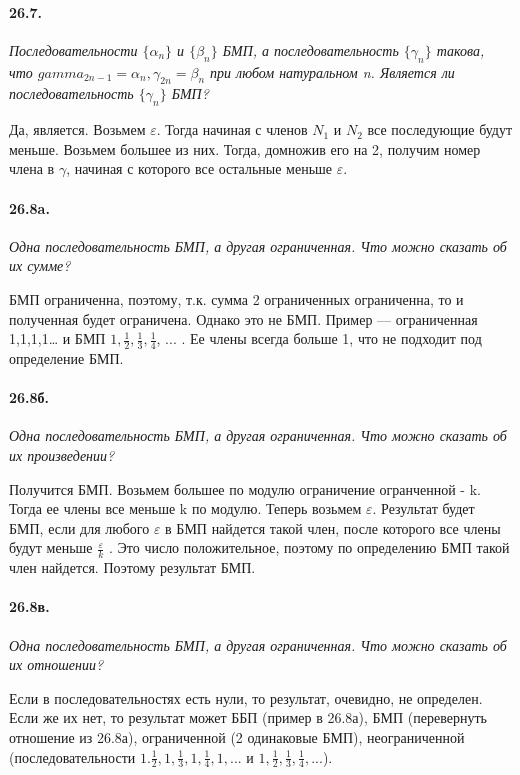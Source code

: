 \documentclass{book}
\begin{document}
\paragraph{26.7.}
\textit{Последовательности $\{\alpha_n\}$ и $\{\beta_n\}$ БМП, а последовательность $\{\gamma_n\}$ такова, что $gamma_{2n -1} = \alpha_n, \gamma_{2n} = \beta_n$ при любом натуральном n. Является ли последовательность $\{\gamma_n\}$ БМП?}

Да, является. Возьмем $\varepsilon$. Тогда начиная с членов $N_1$ и $N_2$ все последующие будут меньше. Возьмем большее из них. Тогда, домножив его на 2, получим номер члена в $\gamma$, начиная с которого все остальные меньше $\varepsilon$.

\paragraph{26.8a.}
\textit{Одна последовательность БМП, а другая ограниченная. Что можно сказать об их сумме?}

БМП ограниченна, поэтому, т.к. сумма 2 ограниченных ограниченна, то и полученная будет ограничена. Однако это не БМП. Пример — ограниченная 1,1,1,1… и БМП $1, \frac{1}{2}, \frac{1}{3}, \frac{1}{4}$, ... . Ее члены всегда больше 1, что не подходит под определение БМП.

\paragraph{26.8б.}
\textit{Одна последовательность БМП, а другая ограниченная. Что можно сказать об их произведении?}

Получится БМП. Возьмем большее по модулю ограничение огранченной - k. Тогда ее члены все меньше k по модулю. Теперь возьмем $\varepsilon$. Результат будет БМП, если для любого $\varepsilon$ в БМП найдется такой член, после которого все члены будут меньше $\frac{\varepsilon}{k}$ . Это число положительное, поэтому по определению БМП такой член найдется. Поэтому результат БМП.

\paragraph{26.8в.}
\textit{Одна последовательность БМП, а другая ограниченная. Что можно сказать об их отношении?}

Если в последовательностях есть нули, то результат, очевидно, не определен. Если же их нет, то результат может ББП (пример в 26.8а), БМП (перевернуть отношение из 26.8а), ограниченной (2 одинаковые БМП), неограниченной (последовательности $1. \frac{1}{2}, 1, \frac{1}{3}, 1, \frac{1}{4}, 1, ...$ и $1, \frac{1}{2}, \frac{1}{3}, \frac{1}{4}, ...$).
\end{document}
